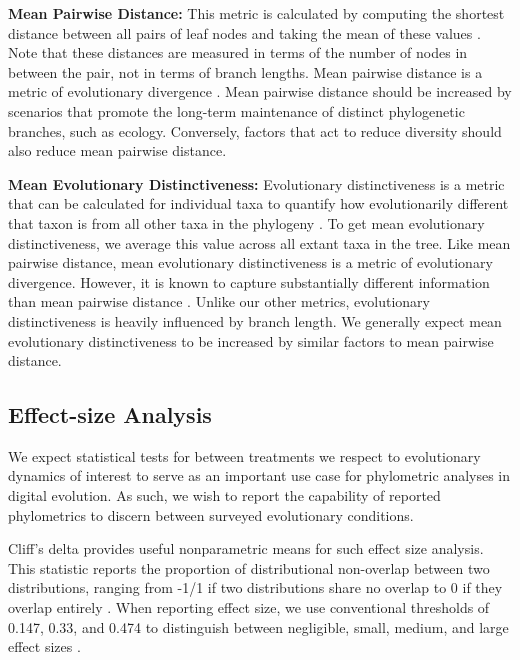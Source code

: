 \textbf{Mean Pairwise Distance:}
This metric is calculated by computing the shortest distance between all pairs of leaf nodes and taking the mean of these values \citep{webbExploringPhylogeneticStructure2000}.
Note that these distances are measured in terms of the number of nodes in between the pair, not in terms of branch lengths.
Mean pairwise distance is a metric of evolutionary divergence \citep{tuckerGuidePhylogeneticMetrics2017}.
Mean pairwise distance should be increased by scenarios that promote the long-term maintenance of distinct phylogenetic branches, such as ecology.
Conversely, factors that act to reduce diversity should also reduce mean pairwise distance.

\textbf{Mean Evolutionary Distinctiveness:}
Evolutionary distinctiveness is a metric that can be calculated for individual taxa to quantify how evolutionarily different that taxon is from all other taxa in the phylogeny \citep{isaacMammalsEDGEConservation2007}.
To get mean evolutionary distinctiveness, we average this value across all extant taxa in the tree.
Like mean pairwise distance, mean evolutionary distinctiveness is a metric of evolutionary divergence.
However, it is known to capture substantially different information than mean pairwise distance \citep{tuckerGuidePhylogeneticMetrics2017}.
Unlike our other metrics, evolutionary distinctiveness is heavily influenced by branch length.
We generally expect mean evolutionary distinctiveness to be increased by similar factors to mean pairwise distance.

\subsection{Effect-size Analysis}

We expect statistical tests for between treatments we respect to evolutionary dynamics of interest to serve as an important use case for phylometric analyses in digital evolution.
As such, we wish to report the capability of reported phylometrics to discern between surveyed evolutionary conditions.

Cliff's delta provides useful nonparametric means for such effect size analysis.
This statistic reports the proportion of distributional non-overlap between two distributions, ranging from -1/1 if two distributions share no overlap to 0 if they overlap entirely \citep{meissel2024using,cliff1993dominance}.
When reporting effect size, we use conventional thresholds of 0.147, 0.33, and 0.474 to distinguish between negligible, small, medium, and large effect sizes \citep{hess2004robust}.


